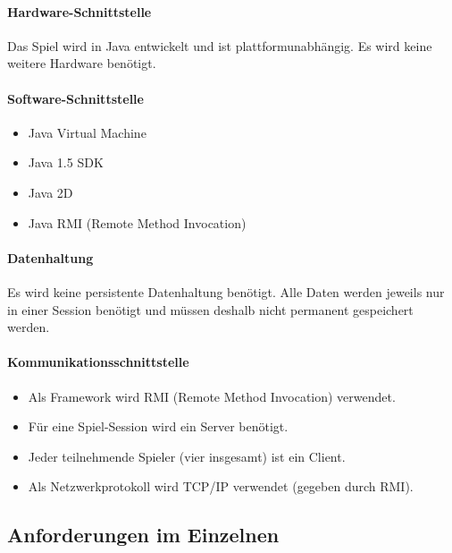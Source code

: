 \documentclass[a4paper,12pt,halfparskip,DIV14]{scrartcl}
\begin{document}
\paragraph{Hardware-Schnittstelle}\label{ssub:hardware_schnittstelle} %
Das Spiel wird in Java entwickelt und ist plattformunabhängig. Es wird keine weitere Hardware benötigt.
\paragraph{Software-Schnittstelle}\label{ssub:software_schnittstelle} %
\begin{itemize}
	\item Java Virtual Machine
	\item Java 1.5 SDK
	\item Java 2D
	\item Java RMI (Remote Method Invocation)
\end{itemize}
\paragraph{Datenhaltung}\label{ssub:datenhaltung} %
Es wird keine persistente Datenhaltung benötigt. Alle Daten werden jeweils nur in einer Session benötigt und müssen deshalb nicht permanent gespeichert werden.
\paragraph{Kommunikationsschnittstelle}\label{ssub:kommunikationsschnittstelle} %
\begin{itemize}
	\item Als Framework wird RMI (Remote Method Invocation) verwendet.
	\item Für eine Spiel-Session wird ein Server benötigt.
	\item Jeder teilnehmende Spieler (vier insgesamt) ist ein Client.
	\item Als Netzwerkprotokoll wird TCP/IP verwendet (gegeben durch RMI).
\end{itemize}

\subsection{Anforderungen im Einzelnen}\label{sub:anforderungen_im_einzelnen} %
\end{document}
